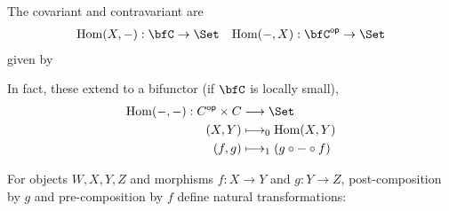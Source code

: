 \documentclass[a5paper]{article}
\newcommand{\comma}{,}
\begin{document}
\begin{definition}
  The covariant and contravariant 
  are
  \begin{align*}
    \Hom(X,-):\bfC\to\Set
    &&
    \Hom(-,X):\bfC^{\op}\to\Set
  \end{align*}
  given by
  \begin{center}
  \begin{minipage}[b]{0.48\linewidth}
    \centering
  \end{minipage}
  \begin{minipage}[b]{0.48\linewidth}
    \centering
  \end{minipage}
  \end{center}
  In fact, these extend to a bifunctor (if $\bfC$ is locally small),
  \begin{align*}
    \Hom(-,-):C^{\op}\times C &\longrightarrow \Set \\
    (X,Y) &\longmapsto_0 \Hom(X,Y) \\
    (f,g) &\longmapsto_1 (g\circ -\circ f)
  \end{align*}
\end{definition}

For objects $W,X,Y,Z$ and morphisms $f:X\to Y$ and $g:Y\to Z$, post-composition
by $g$ and pre-composition by $f$ define natural transformations:
\begin{center}
\end{center}
\end{document}

